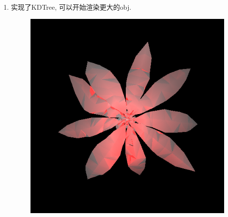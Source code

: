 \begin{enumerate}
\item 实现了KDTree, 可以开始渲染更大的obj.
\begin{figure}[H]
  \centering
  \includegraphics[scale=0.4]{img/flower.png}
  \caption*{\label{fig:flower}}
\end{figure}


\end{enumerate}
